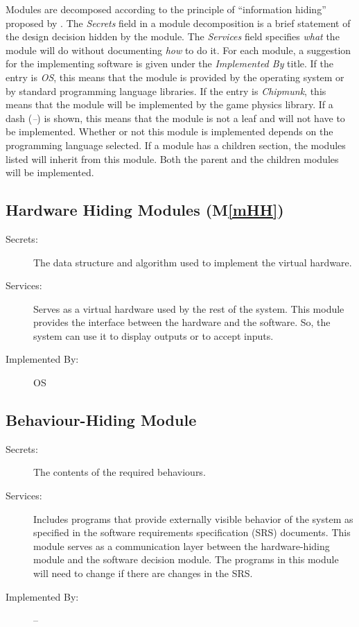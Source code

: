 \documentclass[12pt]{article}
\newcommand{\mref}[1]{M\ref{#1}}
\begin{document}
Modules are decomposed according to the principle of ``information hiding''
proposed by \citet{ParnasEtAl1984}. The \emph{Secrets} field in a module
decomposition is a brief statement of the design decision hidden by the
module. The \emph{Services} field specifies \emph{what} the module will do
without documenting \emph{how} to do it. For each module, a suggestion for the implementing software is given under the \emph{Implemented By} title. If the entry is \emph{OS}, this means that the module is provided by the operating system or by standard programming language libraries. If the entry is \emph{Chipmunk}, this means that the module will be implemented by the 
game physics library.  
If a dash (\emph{--}) is shown, this means
that the module is not a leaf and will not have to be implemented. Whether or
not this module is implemented depends on the programming language
selected.
If a module has a children section, the modules listed will inherit from  
this module. Both the parent and the children modules will be implemented.

\subsection{Hardware Hiding Modules (\mref{mHH})}

\begin{description}
\item[Secrets:]The data structure and algorithm used to implement the virtual
  hardware.
\item[Services:] Serves as a virtual hardware used by the rest of the
  system. This module provides the interface between the hardware and the
  software. So, the system can use it to display outputs or to accept inputs.
\item[Implemented By:] OS
\end{description}

\subsection{Behaviour-Hiding Module}

\begin{description}
\item[Secrets:]The contents of the required behaviours.
\item[Services:]Includes programs that provide externally visible behavior of
  the system as specified in the software requirements specification (SRS)
  documents. This module serves as a communication layer between the
  hardware-hiding module and the software decision module. The programs in this module will need to change if there are changes in the SRS.
\item[Implemented By:] --
\end{description}
\end{document}
